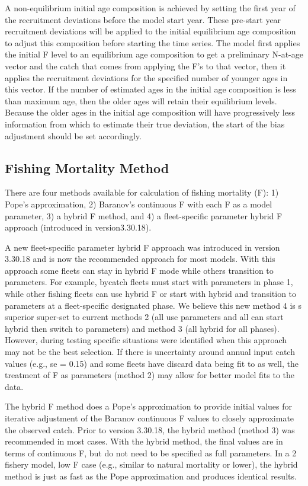 A non-equilibrium initial age composition is achieved by setting the first year of the recruitment deviations before the model start year. These pre-start year recruitment deviations will be applied to the initial equilibrium age composition to adjust this composition before starting the time series. The model first applies the initial F level to an equilibrium age composition to get a preliminary N-at-age vector and the catch that comes from applying the F's to that vector, then it applies the recruitment deviations for the specified number of younger ages in this vector. If the number of estimated ages in the initial age composition is less than maximum age, then the older ages will retain their equilibrium levels. Because the older ages in the initial age composition will have progressively less information from which to estimate their true deviation, the start of the bias adjustment should be set accordingly.

\subsection{Fishing Mortality Method}
There are  four methods available for calculation of fishing mortality (F): 1) Pope's approximation, 2) Baranov's continuous F with each F as a model parameter, 3) a hybrid F method, and 4) a fleet-specific parameter hybrid F approach (introduced in version3.30.18).

A new fleet-specific parameter hybrid F approach was introduced in version 3.30.18 and is now the recommended approach for most models. With this approach some fleets can stay in hybrid F mode while others transition to parameters.  For example, bycatch fleets must start with parameters in phase 1, while other fishing fleets can use hybrid F or start with hybrid and transition to parameters at a fleet-specific designated phase. We believe this new method 4 is s superior super-set to current methods 2 (all use parameters and all can start hybrid then switch to parameters) and method 3 (all hybrid for all phases). However, during testing specific situations were identified when this approach may not be the best selection. If there is uncertainty around annual input catch values (e.g., se = 0.15) and some fleets have discard data being fit to as well, the treatment of F as parameters (method 2) may allow for better model fits to the data.

The hybrid F method does a Pope's approximation to provide initial values for iterative adjustment of the Baranov continuous F values to closely approximate the observed catch.  Prior to version 3.30.18, the hybrid method (method 3) was recommended in most cases. With the hybrid method, the final values are in terms of continuous F, but do not need to be specified as full parameters. In a 2 fishery model, low F case (e.g., similar to natural mortality or lower), the hybrid method is just as fast as the Pope approximation and produces identical results. 

